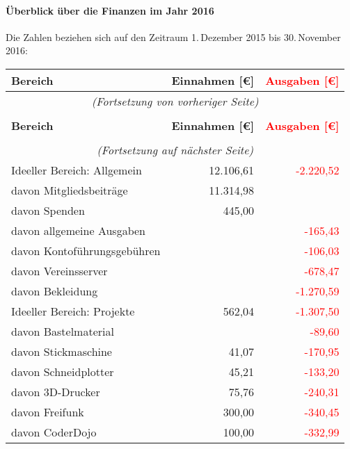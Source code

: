 \documentclass{s0minutes}
\begin{document}
\paragraph{Überblick über die Finanzen im Jahr 2016}
Die Zahlen beziehen sich auf den Zeitraum 1.\,Dezember 2015 bis 30.\,November
2016:

\newpage

\begin{longtable}{lr>{\textcolor{red}\bgroup}r<{\egroup}}
  \textbf{Bereich} & \textbf{Einnahmen [€]} & \textbf{Ausgaben [€]} \\
  \midrule
  \endfirsthead
  \multicolumn{3}{c}{\emph{(Fortsetzung von vorheriger Seite)}} \\
  \\
  \textbf{Bereich} & \textbf{Einnahmen [€]} & \textbf{Ausgaben [€]} \\
  \midrule
  \endhead
  \\
  \multicolumn{3}{c}{\emph{(Fortsetzung auf nächster Seite)}} \\
  \endfoot
  \endlastfoot
  Ideeller Bereich: Allgemein       & 12{.}106{,}61 &  -2{.}220{,}52 \\
  \quad davon Mitgliedsbeiträge     & 11{.}314{,}98 &                \\
  \quad davon Spenden               &      445{,}00 &                \\
  \quad davon allgemeine Ausgaben   &               &      -165{,}43 \\
  \quad davon Kontoführungsgebühren &               &      -106{,}03 \\
  \quad davon Vereinsserver         &               &      -678{,}47 \\
  \quad davon Bekleidung            &               &  -1{.}270{,}59 \\
  \midrule
  Ideeller Bereich: Projekte        &      562{,}04 &  -1{.}307{,}50 \\
  \quad davon Bastelmaterial        &               &       -89{,}60 \\
  \quad davon Stickmaschine         &       41{,}07 &      -170{,}95 \\
  \quad davon Schneidplotter        &       45{,}21 &      -133{,}20 \\
  \quad davon 3D-Drucker            &       75{,}76 &      -240{,}31 \\
  \quad davon Freifunk              &      300{,}00 &      -340{,}45 \\
  \quad davon CoderDojo             &      100{,}00 &      -332{,}99 \\

\end{longtable}
\end{document}
